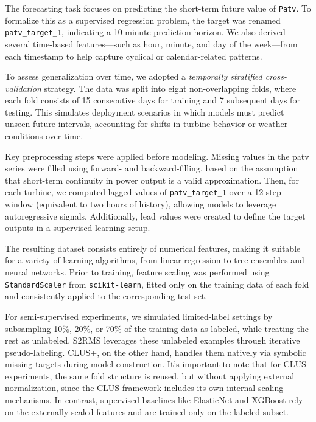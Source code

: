 The forecasting task focuses on predicting the short-term future value of \texttt{Patv}. To formalize this as a supervised regression problem, the target was renamed \texttt{patv\_target\_1}, indicating a 10-minute prediction horizon. We also derived several time-based features—such as hour, minute, and day of the week—from each timestamp to help capture cyclical or calendar-related patterns.

To assess generalization over time, we adopted a \textit{temporally stratified cross-validation} strategy. The data was split into eight non-overlapping folds, where each fold consists of 15 consecutive days for training and 7 subsequent days for testing. This simulates deployment scenarios in which models must predict unseen future intervals, accounting for shifts in turbine behavior or weather conditions over time.

Key preprocessing steps were applied before modeling. Missing values in the patv series were filled using forward- and backward-filling, based on the assumption that short-term continuity in power output is a valid approximation. Then, for each turbine, we computed lagged values of \texttt{patv\_target\_1} over a 12-step window (equivalent to two hours of history), allowing models to leverage autoregressive signals. Additionally, lead values were created to define the target outputs in a supervised learning setup.

The resulting dataset consists entirely of numerical features, making it suitable for a variety of learning algorithms, from linear regression to tree ensembles and neural networks. Prior to training, feature scaling was performed using \texttt{StandardScaler} from \texttt{scikit-learn}, fitted only on the training data of each fold and consistently applied to the corresponding test set.

For semi-supervised experiments, we simulated limited-label settings by subsampling 10\%, 20\%, or 70\% of the training data as labeled, while treating the rest as unlabeled. S2RMS leverages these unlabeled examples through iterative pseudo-labeling. CLUS+, on the other hand, handles them natively via symbolic missing targets during model construction. It's important to note that for CLUS experiments, the same fold structure is reused, but without applying external normalization, since the CLUS framework includes its own internal scaling mechanisms. In contrast, supervised baselines like ElasticNet and XGBoost rely on the externally scaled features and are trained only on the labeled subset.

